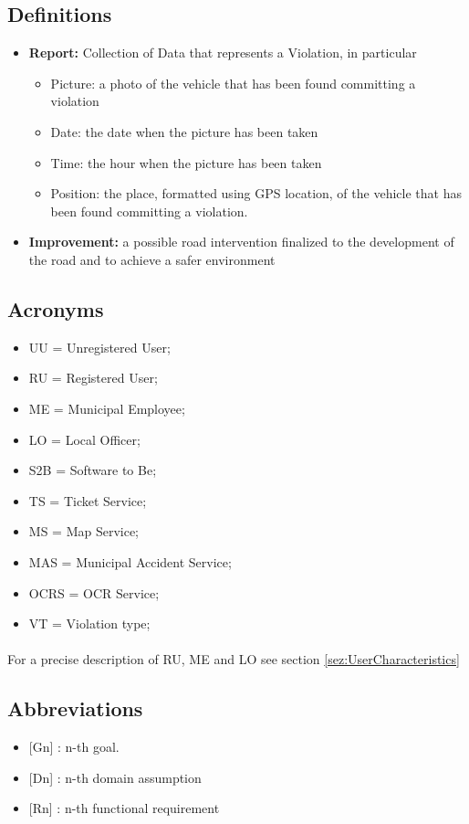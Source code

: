 			\subsection{Definitions}
				\begin{itemize}
					\item \textbf{Report:} Collection of Data that represents a Violation, in particular
						\begin{itemize}
							\item Picture: a photo of the vehicle that has been found committing a violation
							\item Date: the date when the picture has been taken
							\item Time: the hour when the picture has been taken
							\item Position: the place, formatted using GPS location, of the vehicle that has been found committing a violation.
						\end{itemize}
					\item \textbf{Improvement:} a possible road intervention finalized to the development of the road and to achieve a safer environment
				\end{itemize}
			\subsection{Acronyms}
				\begin{itemize}
					\item UU = Unregistered User;
					\item RU = Registered User;
					\item ME = Municipal Employee;
					\item LO = Local Officer;
					\item S2B = Software to Be;
					\item TS = Ticket Service;
					\item MS = Map Service;
					\item MAS = Municipal Accident Service;
					\item OCRS = OCR Service;
					\item VT = Violation type;
				\end{itemize}
				\paragraph{}
					For a precise description of RU, ME and LO see section \ref{sez:UserCharacteristics}
					
			\subsection{Abbreviations}
				\begin{itemize}
					\item {[Gn]} : n-th goal.
					\item {[Dn]} : n-th domain assumption
					\item {[Rn]} : n-th functional requirement
				\end{itemize}
